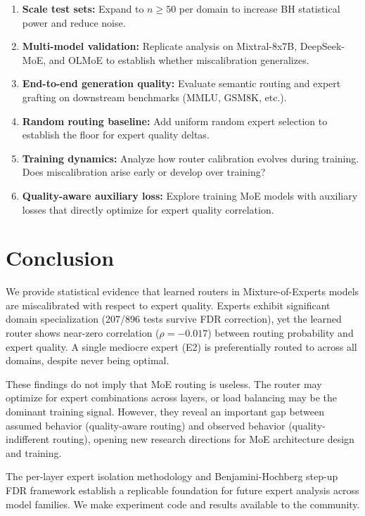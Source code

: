 \documentclass[11pt,a4paper]{article}
\begin{document}
\begin{enumerate}
\item \textbf{Scale test sets:} Expand to $n \geq 50$ per domain to increase BH statistical power and reduce noise.

\item \textbf{Multi-model validation:} Replicate analysis on Mixtral-8x7B, DeepSeek-MoE, and OLMoE to establish whether miscalibration generalizes.

\item \textbf{End-to-end generation quality:} Evaluate semantic routing and expert grafting on downstream benchmarks (MMLU, GSM8K, etc.).

\item \textbf{Random routing baseline:} Add uniform random expert selection to establish the floor for expert quality deltas.

\item \textbf{Training dynamics:} Analyze how router calibration evolves during training. Does miscalibration arise early or develop over training?

\item \textbf{Quality-aware auxiliary loss:} Explore training MoE models with auxiliary losses that directly optimize for expert quality correlation.
\end{enumerate}

\section{Conclusion}

We provide statistical evidence that learned routers in Mixture-of-Experts models are miscalibrated with respect to expert quality. Experts exhibit significant domain specialization (207/896 tests survive FDR correction), yet the learned router shows near-zero correlation ($\rho = -0.017$) between routing probability and expert quality. A single mediocre expert (E2) is preferentially routed to across all domains, despite never being optimal.

These findings do not imply that MoE routing is useless. The router may optimize for expert combinations across layers, or load balancing may be the dominant training signal. However, they reveal an important gap between assumed behavior (quality-aware routing) and observed behavior (quality-indifferent routing), opening new research directions for MoE architecture design and training.

The per-layer expert isolation methodology and Benjamini-Hochberg step-up FDR framework establish a replicable foundation for future expert analysis across model families. We make experiment code and results available to the community.
\end{document}
